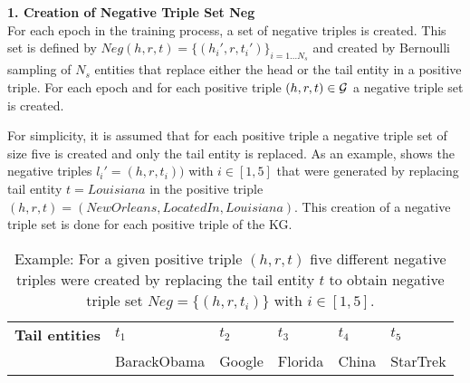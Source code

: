 \textbf{1. Creation of Negative Triple Set Neg}\\
For each epoch in the training process, a set of negative triples is created.
This set is defined by $Neg(h,r,t)=\{(h_i',r,t_i')\}_{i=1\dots N_s}$ and created by Bernoulli sampling of $N_s$ entities that replace either the head or the tail entity in a positive triple.
For each epoch and for each positive triple $(h,r,t) \in \mathcal{G}$ a negative triple set is created.

For simplicity, it is assumed that for each positive triple a negative triple set of size five is created and only the tail entity is replaced.
As an example,  shows the negative triples $l_i' = (h, r, t_i))$ with $i \in [1,5]$ that were generated by replacing tail entity $t = Louisiana$ in the positive triple $(h, r, t) = (NewOrleans, LocatedIn, Louisiana)$. 
This creation of a negative triple set is done for each positive triple of the KG.
\begin{table}[H]
    \centering
    \begin{tabular}{llllll}
        \toprule
        
        \textbf{Tail entities}
        & \textbf{$t_1$} & \textbf{$t_2$} & \textbf{$t_3$} & \textbf{$t_4$} & \textbf{$t_5$} \\
        
        & BarackObama 
        & Google  
        & Florida 
        & China 
        & StarTrek\\

        \bottomrule
    \end{tabular}
    \caption{Example: For a given positive triple $(h,r,t)$ five different negative triples were created by replacing the tail entity $t$ to obtain negative triple set $Neg = \{(h,r,t_i)\}$ with $i \in [1,5]$.}
\label{tab:neg_example}
\end{table}